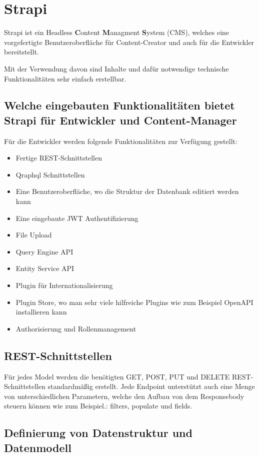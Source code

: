 \section{Strapi}
Strapi ist ein Headless \textbf{C}ontent \textbf{M}anagment \textbf{S}ystem (CMS),
welches eine vorgefertigte Benutzeroberfläche für Content-Creator
und auch für die Entwickler bereitstellt.

Mit der Verwendung davon sind Inhalte und dafür notwendige technische Funktionalitäten
sehr einfach erstellbar.
\cite{strapi-vs-wordpress}


\subsection*{Welche eingebauten Funktionalitäten bietet Strapi für Entwickler und Content-Manager}


Für die Entwickler werden folgende Funktionalitäten zur Verfügung gestellt:

\begin{itemize}
  \item Fertige REST-Schnittstellen
  \item Qraphql Schnittstellen
  \item Eine Benutzeroberfläche, wo die Struktur der Datenbank editiert werden kann
  \item Eine eingebaute JWT Authentifizierung
  \item File Upload
  \item Query Engine API
  \item Entity Service API
  \item Plugin für Internationalisierung
  \item Plugin Store, wo man sehr viele hilfreiche Plugins wie zum Beispiel OpenAPI installieren kann
  \item Authorisierung und Rollenmanagement
\end{itemize}

\subsection{REST-Schnittstellen}
\label{subsec:rest}
Für jedes Model werden die benötigten GET, POST, PUT und DELETE REST-Schnittstellen standardmäßig erstellt.
Jede Endpoint unterstützt auch eine Menge von unterschiedlichen Parametern, welche den Aufbau von dem Responsebody steuern können wie zum Beispiel.: filters, populate  und fields.
\cite{rest-query-parameters}
\subsection{Definierung von Datenstruktur und Datenmodell}

